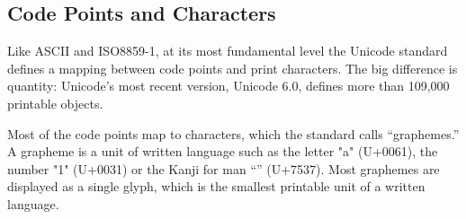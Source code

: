 \subsection{Code Points and Characters}

Like ASCII and ISO8859-1, at its most fundamental level the Unicode
standard defines a mapping between code points and print
characters. The big difference is quantity: Unicode's most recent
version, Unicode 6.0, defines more than 109,000 printable objects.

Most of the code points map to characters, which the standard  calls
``graphemes.'' A grapheme is a unit of written language such as the
letter "a" (U+0061), the number "1" (U+0031) or the Kanji for man
``'' (U+7537). Most graphemes are
displayed as a single glyph, which is the smallest printable unit of a
written language.  

